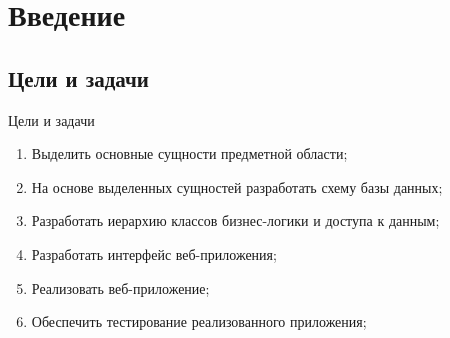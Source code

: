 \section{Введение}
\subsection{Цели и задачи}

\begin{frame}
	\begin{center}
		\large
		Цели и задачи
	\end{center}
	\begin{enumerate}
		\item Выделить основные сущности предметной области;
    	\item На основе выделенных сущностей разработать схему базы данных;
    	\item Разработать иерархию классов бизнес-логики и доступа к данным;
    	\item Разработать интерфейс веб-приложения;
    	\item Реализовать веб-приложение;
    	\item Обеспечить тестирование реализованного приложения;
	\end{enumerate}
\end{frame}
